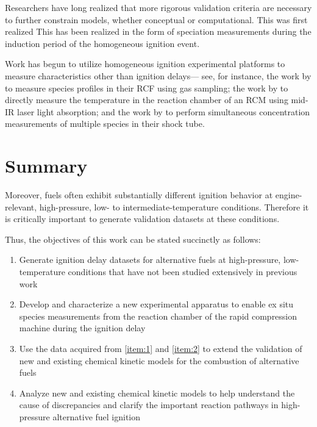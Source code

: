 \documentclass[../main.tex]{subfiles}
\begin{document}

Researchers have long realized that more rigorous validation criteria are
necessary to further constrain models, whether conceptual or computational. 
This was first realized This has been realized in the form of speciation measurements during the induction period of the homogeneous
ignition event. 

Work has begun to utilize homogeneous ignition experimental
platforms to measure characteristics other than ignition delays---%
see, for instance, the work by \textcite{Karwat2011a} to measure species
profiles in their RCF using gas sampling; the work by \textcite{Das2012,Uddi2012}
to directly measure the temperature in the reaction chamber of an RCM using
mid-IR laser light absorption; and the work by \textcite{Stranic2013}
to perform simultaneous concentration measurements of multiple species in their
shock tube.

\cite{Downs1951,Pahnke1954}

\cite{Roblee1961,Minetti1995,Karwat2013,Beeley1980,Minetti1994,He2007,Affleck1967,
Martinengo1965,Karwat2012,Karwat2011a,Fujimoto2004,He2005a,Mittal2007}

\section{Summary}

Moreover, fuels often exhibit substantially different ignition behavior
at engine-relevant, high-pressure, low- to intermediate-temperature
conditions. Therefore it is critically important to generate validation
datasets at these conditions.

Thus, the objectives of this work can be stated succinctly as follows:

\begin{enumerate}
\item \label{item:1} Generate ignition delay datasets for alternative
fuels at high-pressure, low-temperature conditions that have not been
studied extensively in previous work

\item \label{item:2} Develop and characterize a new experimental
apparatus to enable ex situ species measurements from the reaction
chamber of the rapid compression machine during the ignition delay

\item Use the data acquired from \cref{item:1} and \cref{item:2}
to extend the validation of new and existing chemical kinetic models
for the combustion of alternative fuels

\item Analyze new and existing chemical kinetic models to help
understand the cause of discrepancies and clarify the important
reaction pathways in high-pressure alternative fuel ignition
\end{enumerate}
\end{document}
